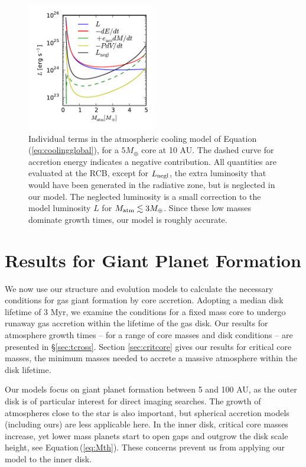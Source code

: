 \documentclass[apj, numberedappendix]{emulateapj}
\newcommand{\Eq}[1]{Equation\,(\ref{#1})}
\begin{document}
 
\begin{figure}[tb]
\centering
\includegraphics[width=0.5\textwidth]{../../figs/ModelAtmospheres/RadSelfGravPoly/PaperFigs/cooling_a10_Mc5_rcb_paper.pdf}
\caption{Individual terms in the atmospheric cooling model of \Eq{eq:coolingglobal}, for a $5 M_\oplus$ core at 10 AU.  The dashed curve for accretion energy indicates a negative contribution.  All quantities are evaluated at the RCB, except for $L_{\rm negl}$, the extra luminosity that would have been generated in the radiative zone, but is neglected in our model. The neglected luminosity is a small correction to the model luminosity $L$ for $M_{\rm atm} \lesssim 3 M_{\oplus}$.   Since these low masses dominate growth times, our model is roughly accurate.}
\label{fig:coolingterms}
\end{figure}



\section{Results for Giant Planet Formation}
\label{sec:critical}

We now use our structure and evolution models to calculate the necessary conditions for gas giant formation by core accretion.   Adopting a median disk lifetime of 3 Myr, we examine the conditions for a fixed mass core to undergo runaway gas accretion within the lifetime of the gas disk.  Our results for atmosphere growth times -- for a range of core masses and disk conditions -- are presented in \S\ref{sec:tcross}.  Section \ref{sec:critcore} gives our results for critical core masses, the minimum masses needed to accrete a massive atmosphere within the disk lifetime.

Our models focus on giant planet formation between 5 and 100 AU, as the outer disk is of particular interest for direct imaging searches.   The growth of atmospheres close to the star is also important, but spherical accretion models (including ours) are less applicable here.  In the inner disk, critical core masses increase, yet lower mass planets start to open gaps and outgrow the disk scale height, see \Eq{eq:Mth}.  These concerns prevent us from applying our model to the inner disk. 
\end{document}
